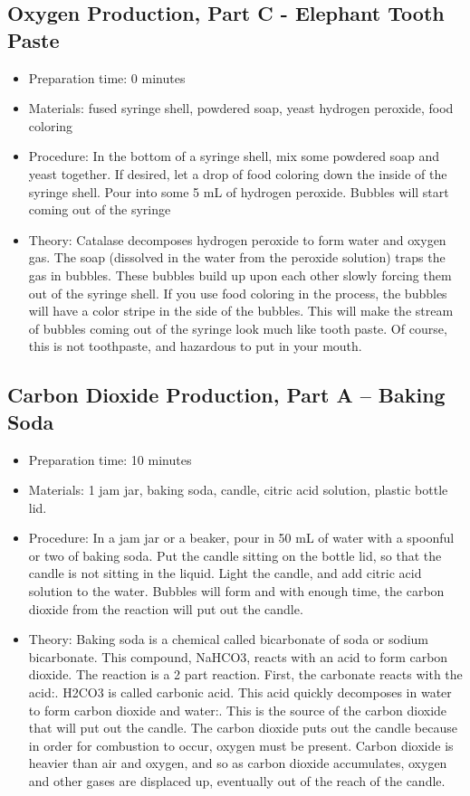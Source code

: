 \subsection{Oxygen Production, Part C - Elephant Tooth Paste}
\begin{itemize}
\item{Preparation time: 0 minutes}
\item{Materials: fused syringe shell, powdered soap, yeast hydrogen peroxide, food coloring}
\item{Procedure: In the bottom of a syringe shell, mix some powdered soap and yeast together. If desired, let a drop of food coloring down the inside of the syringe shell. Pour into some 5 mL of hydrogen peroxide. Bubbles will start coming out of the syringe}
\item{Theory: Catalase decomposes hydrogen peroxide to form water and oxygen gas. The soap (dissolved in the water from the peroxide solution) traps the gas in bubbles. These bubbles build up upon each other slowly forcing them out of the syringe shell. If you use food coloring in the process, the bubbles will have a color stripe in the side of the bubbles. This will make the stream of bubbles coming out of the syringe look much like tooth paste. Of course, this is not toothpaste, and hazardous to put in your mouth.}
\end{itemize}

\subsection{Carbon Dioxide Production, Part A – Baking Soda}
\begin{itemize}
\item{Preparation time: 10 minutes}
\item{Materials: 1 jam jar, baking soda, candle, citric acid solution, plastic bottle lid.}
\item{Procedure: In a jam jar or a beaker, pour in 50 mL of water with a spoonful or two of baking soda. Put the candle sitting on the bottle lid, so that the candle is not sitting in the liquid. Light the candle, and add citric acid solution to the water. Bubbles will form and with enough time, the carbon dioxide from the reaction will put out the candle.}
\item{Theory: Baking soda is a chemical called bicarbonate of soda or sodium bicarbonate. This compound, NaHCO3, reacts with an acid to form carbon dioxide. The reaction is a 2 part reaction. First, the carbonate reacts with the acid:. H2CO3 is called carbonic acid. This acid quickly decomposes in water to form carbon dioxide and water:. This is the source of the carbon dioxide that will put out the candle. The carbon dioxide puts out the candle because in order for combustion to occur, oxygen must be present. Carbon dioxide is heavier than air and oxygen, and so as carbon dioxide accumulates, oxygen and other gases are displaced up, eventually out of the reach of the candle.}
\end{itemize}


